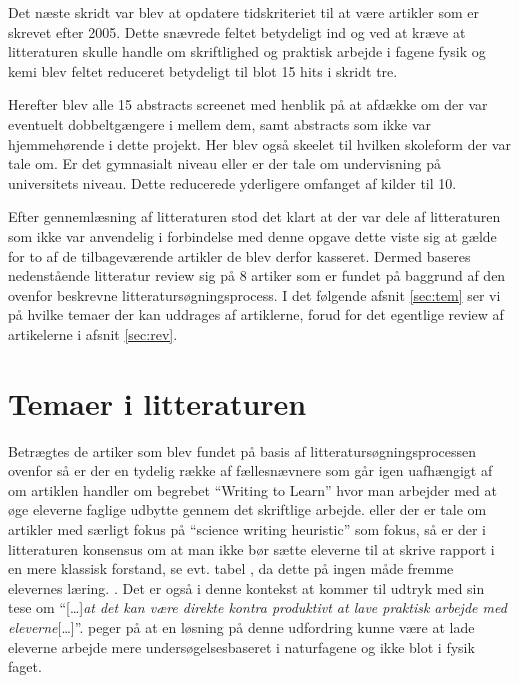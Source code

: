 Det næste skridt var blev at opdatere tidskriteriet til at være artikler som er skrevet efter 2005. Dette snævrede feltet betydeligt ind og ved at kræve at litteraturen skulle handle om skriftlighed og praktisk arbejde i fagene fysik og kemi blev feltet reduceret betydeligt til blot 15 hits i skridt tre.

Herefter blev alle 15 abstracts screenet med henblik på at afdække om der var eventuelt dobbeltgængere i mellem dem, samt abstracts som ikke var hjemmehørende i dette projekt. Her blev også skeelet til hvilken skoleform der var tale om. Er det gymnasialt niveau eller er der tale om undervisning på universitets niveau. Dette reducerede yderligere omfanget af kilder til 10.

Efter gennemlæsning af litteraturen stod det klart at der var dele af litteraturen som ikke var anvendelig i forbindelse med denne opgave dette viste sig at gælde for to af de tilbageværende artikler de blev derfor kasseret. Dermed baseres nedenstående litteratur review sig på 8 artiker som er fundet på baggrund af den ovenfor beskrevne litteratursøgningsprocess. I det følgende afsnit \vref{sec:tem} ser vi på hvilke temaer der kan uddrages af artiklerne, forud for det egentlige review af artikelerne i afsnit \vref{sec:rev}. 


\section{Temaer i litteraturen}
\label{sec:tem}

Betrægtes de artiker som blev fundet på basis af litteratursøgningsprocessen ovenfor så er der en tydelig række af fællesnævnere som går igen uafhængigt af om artiklen handler om begrebet ``Writing to Learn'' hvor man arbejder med at øge eleverne faglige udbytte gennem det skriftlige arbejde. eller der er tale om artikler med særligt fokus på ``science writing heuristic'' som fokus, så er der i litteraturen konsensus om at man ikke bør sætte eleverne til at skrive rapport i en mere klassisk forstand, se evt. tabel , da dette på ingen måde fremme elevernes læring. \citep{Akkus2007, Atasoy2013, Burke2005, Keys1999}. Det er også i denne kontekst at \citet{Hodson2008} kommer til udtryk med sin tese om ``[\ldots]\emph{at det kan være direkte kontra produktivt at lave praktisk arbejde med eleverne}[\ldots]''. \citet{Krogh2016,Dolin2014} peger på at en løsning på denne udfordring kunne være at lade eleverne arbejde mere undersøgelsesbaseret i naturfagene og ikke blot i fysik faget. 

